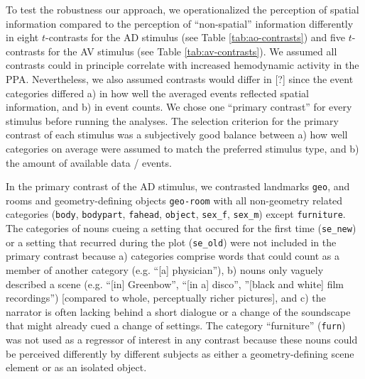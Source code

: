 \documentclass[english]{article}
\begin{document}
To test the robustness our approach, we operationalized the perception of
spatial information compared to the perception of ``non-spatial'' information
differently in eight $t$-contrasts for the AD stimulus (see Table
\ref{tab:ao-contrasts}) and five $t$-contrasts for the AV stimulus (see Table
\ref{tab:av-contrasts}).
We assumed all contrasts could in principle correlate with increased hemodynamic
activity in the PPA.
Nevertheless, we also assumed contrasts would differ in [?]  since the event categories differed a) in how well the
averaged events reflected spatial information, and b) in event counts.
We chose one ``primary contrast'' for every stimulus before running the
analyses.
The selection criterion for the primary contrast of each stimulus was a
subjectively good balance between a) how well categories on average were assumed
to match the preferred stimulus type, and b) the amount of available data /
events.

In the primary contrast of the AD stimulus, we contrasted landmarks
\texttt{geo}, and rooms and geometry-defining objects \texttt{geo-room} with all non-geometry related categories (\texttt{body},
\texttt{bodypart}, \texttt{fahead}, \texttt{object}, \texttt{sex\_f},
\texttt{sex\_m}) except \texttt{furniture}.
The categories of nouns cueing a setting that occured for the first time
(\texttt{se\_new}) or a setting that recurred during the plot (\texttt{se\_old})
were not included in the primary contrast because
a) categories comprise words that could count as a member of another category
(e.g. ``[a] physician''),
b) nouns only vaguely described a scene (e.g. ``[in] Greenbow'', ``[in a]
disco'', ''[black and white] film recordings'') [compared to whole, perceptually
richer pictures], and
c) the narrator is often lacking behind a short dialogue or a change of the
soundscape that might already cued a change of settings.
The category ``furniture'' (\texttt{furn}) was not used as a regressor of
interest in any contrast because these nouns could be perceived differently by
different subjects as either a geometry-defining scene element or as an isolated
object.
\end{document}

